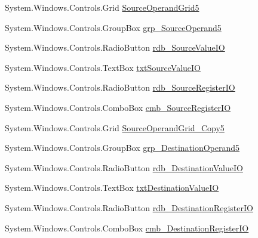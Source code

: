 \begin{DoxyCompactItemize}
\item 
System.\+Windows.\+Controls.\+Grid \hyperlink{class_c_p_u___o_s___simulator_1_1_instructions_window_a3066f4664c81bacc6decdf84d08e74a9}{Source\+Operand\+Grid5}
\item 
System.\+Windows.\+Controls.\+Group\+Box \hyperlink{class_c_p_u___o_s___simulator_1_1_instructions_window_ab16ea5f8e2e761d0a7a0fe7054dfa3b5}{grp\+\_\+\+Source\+Operand5}
\item 
System.\+Windows.\+Controls.\+Radio\+Button \hyperlink{class_c_p_u___o_s___simulator_1_1_instructions_window_ad7bb114a6f948e79e55a44943ecf660a}{rdb\+\_\+\+Source\+Value\+I\+O}
\item 
System.\+Windows.\+Controls.\+Text\+Box \hyperlink{class_c_p_u___o_s___simulator_1_1_instructions_window_a14161b7bebd71e7545b59f77f6254a26}{txt\+Source\+Value\+I\+O}
\item 
System.\+Windows.\+Controls.\+Radio\+Button \hyperlink{class_c_p_u___o_s___simulator_1_1_instructions_window_a30064f400e25a6b155a34108a3fba816}{rdb\+\_\+\+Source\+Register\+I\+O}
\item 
System.\+Windows.\+Controls.\+Combo\+Box \hyperlink{class_c_p_u___o_s___simulator_1_1_instructions_window_a9f9d831a77d174675da89b1fe03602ad}{cmb\+\_\+\+Source\+Register\+I\+O}
\item 
System.\+Windows.\+Controls.\+Grid \hyperlink{class_c_p_u___o_s___simulator_1_1_instructions_window_a5a43b8933f014dffe28d3aa610518a94}{Source\+Operand\+Grid\+\_\+\+Copy5}
\item 
System.\+Windows.\+Controls.\+Group\+Box \hyperlink{class_c_p_u___o_s___simulator_1_1_instructions_window_aa99ecad0d35bc5e70a8924c9b3913106}{grp\+\_\+\+Destination\+Operand5}
\item 
System.\+Windows.\+Controls.\+Radio\+Button \hyperlink{class_c_p_u___o_s___simulator_1_1_instructions_window_a012739d419d605946f5dc0fd645db182}{rdb\+\_\+\+Destination\+Value\+I\+O}
\item 
System.\+Windows.\+Controls.\+Text\+Box \hyperlink{class_c_p_u___o_s___simulator_1_1_instructions_window_afd9084fd83f0c60a4fa1bba1cbcaf5af}{txt\+Destination\+Value\+I\+O}
\item 
System.\+Windows.\+Controls.\+Radio\+Button \hyperlink{class_c_p_u___o_s___simulator_1_1_instructions_window_a507ebe0998697ce8b2345fac2d9498a1}{rdb\+\_\+\+Destination\+Register\+I\+O}
\item 
System.\+Windows.\+Controls.\+Combo\+Box \hyperlink{class_c_p_u___o_s___simulator_1_1_instructions_window_a821452c6d5ab7be60996d3171a2d4cf1}{cmb\+\_\+\+Destination\+Register\+I\+O}

\end{DoxyCompactItemize}
